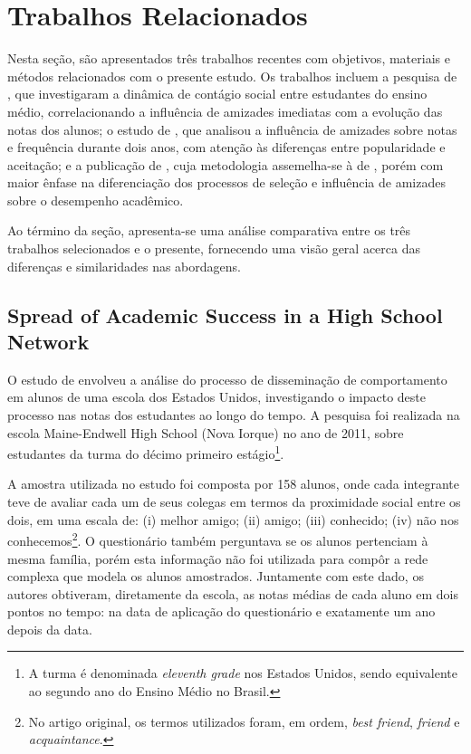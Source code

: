\section{Trabalhos Relacionados} \label{sec:relatedwork}

Nesta seção, são apresentados três trabalhos recentes com objetivos, materiais e métodos relacionados com o presente estudo. Os trabalhos incluem a pesquisa de , que investigaram a dinâmica de contágio social entre estudantes do ensino médio, correlacionando a influência de amizades imediatas com a evolução das notas dos alunos; o estudo de , que analisou a influência de amizades sobre notas e frequência durante dois anos, com atenção às diferenças entre popularidade e aceitação; e a publicação de , cuja metodologia assemelha-se à de , porém com maior ênfase na diferenciação dos processos de seleção e influência de amizades sobre o desempenho acadêmico.

Ao término da seção, apresenta-se uma análise comparativa entre os três trabalhos selecionados e o presente, fornecendo uma visão geral acerca das diferenças e similaridades nas abordagens.

\subsection{Spread of Academic Success in a High School Network} \label{sec:blansky}

O estudo de  envolveu a análise do processo de disseminação de comportamento em alunos de uma escola dos Estados Unidos, investigando o impacto deste processo nas notas dos estudantes ao longo do tempo. A pesquisa foi realizada na escola Maine-Endwell High School (Nova Iorque) no ano de 2011, sobre estudantes da turma do décimo primeiro estágio\footnote{A turma é denominada \textit{eleventh grade} nos Estados Unidos, sendo equivalente ao segundo ano do Ensino Médio no Brasil.}.

A amostra utilizada no estudo foi composta por 158 alunos, onde cada integrante teve de avaliar cada um de seus colegas em termos da proximidade social entre os dois, em uma escala de: (i) melhor amigo; (ii) amigo; (iii) conhecido; (iv) não nos conhecemos\footnote{No artigo original, os termos utilizados foram, em ordem, \textit{best friend}, \textit{friend} e \textit{acquaintance}.}. O questionário também perguntava se os alunos pertenciam à mesma família, porém esta informação não foi utilizada para compôr a rede complexa que modela os alunos amostrados. Juntamente com este dado, os autores obtiveram, diretamente da escola, as notas médias de cada aluno em dois pontos no tempo: na data de aplicação do questionário e exatamente um ano depois da data.

